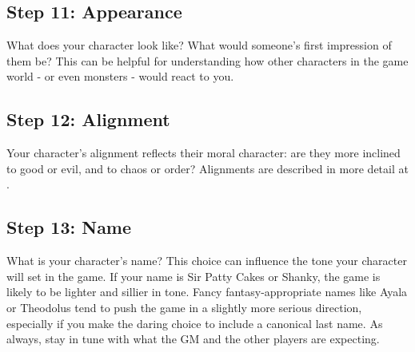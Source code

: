   \subsection{Step 11: Appearance}
    What does your character look like?
    What would someone's first impression of them be?
    This can be helpful for understanding how other characters in the game world - or even monsters - would react to you.

  \subsection{Step 12: Alignment}
    Your character's alignment reflects their moral character: are they more inclined to good or evil, and to chaos or order?
    Alignments are described in more detail at .

  \subsection{Step 13: Name}
    What is your character's name?
    This choice can influence the tone your character will set in the game.
    If your name is Sir Patty Cakes or Shanky, the game is likely to be lighter and sillier in tone.
    Fancy fantasy-appropriate names like Ayala or Theodolus tend to push the game in a slightly more serious direction, especially if you make the daring choice to include a canonical last name.
    As always, stay in tune with what the GM and the other players are expecting.
